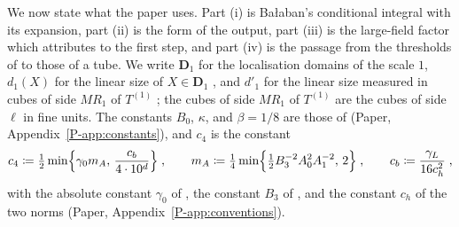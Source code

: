 \documentclass[11pt]{preprint}
\numberwithin{equation}{section}
\theoremstyle{definition}
\theoremstyle{remark}
\theoremstyle{plain}
\begin{document}
We now state what the paper uses. Part (i) is Ba{\l}aban's conditional integral \cite[(1.26), p.~253]{BalabanCRE} with its expansion, part (ii) is the form \cite[(1.28)--(1.30), pp.~253--254]{BalabanCRE} of the output, part (iii) is the large-field factor which \cite[(1.79), p.~383]{BalabanLFR2} attributes to the first step, and part (iv) is the passage from the thresholds of \cite{WilsonFirstStep} to those of a tube. We write $\mathbf D_1$ for the localisation domains of the scale $1$, $d_1(X)$ for the linear size of $X \in \mathbf D_1$ \cite[p.~257]{BalabanRG1}, and $d'_1$ for the linear size measured in cubes of side $MR_1$ of $T^{(1)}$ \cite[p.~380]{BalabanLFR2}; the cubes of side $MR_1$ of $T^{(1)}$ are the cubes of side $\ell$ in fine units. The constants $B_0$, $\kappa$, and $\beta = 1/8$ are those of \cite[(2.42), p.~261]{BalabanCRE} (Paper, Appendix~\ref{P-app:constants}), and $c_4$ is the constant
\begin{equation}\label{eq:retreat-constant}
    c_4 \coloneqq \tfrac12\min\Bigl\{ \gamma_0m_A,\, \frac{c_b}{4 \cdot 10^d} \Bigr\}\;,
    \qquad
    m_A \coloneqq \tfrac14\min\Bigl\{ \tfrac12B_3^{-2}A_0^2A_1^{-2},\, 2 \Bigr\}\;,
    \qquad
    c_b \coloneqq \frac{\gamma_L}{16c_h^2}\;,
\end{equation}
with the absolute constant $\gamma_0$ of \cite[p.~380]{BalabanLFR2}, the constant $B_3$ of \cite[Theorem~1, p.~279]{BalabanVAR}, and the constant $c_h$ of the two norms (Paper, Appendix~\ref{P-app:conventions}).
\end{document}
